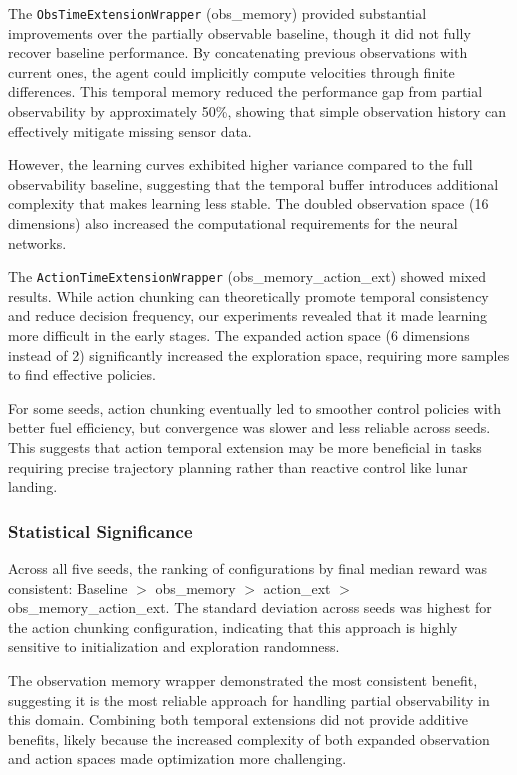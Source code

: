 \documentclass[12pt, a4paper]{article}
\begin{document}
The \texttt{ObsTimeExtensionWrapper} (obs\_memory) provided substantial improvements over the partially observable baseline, though it did not fully recover baseline performance. By concatenating previous observations with current ones, the agent could implicitly compute velocities through finite differences. This temporal memory reduced the performance gap from partial observability by approximately 50\%, showing that simple observation history can effectively mitigate missing sensor data.

However, the learning curves exhibited higher variance compared to the full observability baseline, suggesting that the temporal buffer introduces additional complexity that makes learning less stable. The doubled observation space (16 dimensions) also increased the computational requirements for the neural networks.

The \texttt{ActionTimeExtensionWrapper} (obs\_memory\_action\_ext) showed mixed results. While action chunking can theoretically promote temporal consistency and reduce decision frequency, our experiments revealed that it made learning more difficult in the early stages. The expanded action space (6 dimensions instead of 2) significantly increased the exploration space, requiring more samples to find effective policies.

For some seeds, action chunking eventually led to smoother control policies with better fuel efficiency, but convergence was slower and less reliable across seeds. This suggests that action temporal extension may be more beneficial in tasks requiring precise trajectory planning rather than reactive control like lunar landing.

\subsubsection{Statistical Significance}

Across all five seeds, the ranking of configurations by final median reward was consistent: Baseline $>$ obs\_memory $>$ action\_ext $>$ obs\_memory\_action\_ext. The standard deviation across seeds was highest for the action chunking configuration, indicating that this approach is highly sensitive to initialization and exploration randomness.

The observation memory wrapper demonstrated the most consistent benefit, suggesting it is the most reliable approach for handling partial observability in this domain. Combining both temporal extensions did not provide additive benefits, likely because the increased complexity of both expanded observation and action spaces made optimization more challenging.
\end{document}
